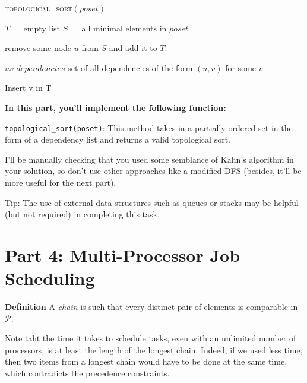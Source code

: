 \documentclass{article}
\begin{document}
    \begin{algorithm}
        \caption{\textsc{topological\_sort}$(poset)$}\label{alg:cap}
        \label{alg:topological_sort}
        \begin{algorithmic}
            \State $T = $ empty list
            \State $S = $ all minimal elements in $poset$
            
                remove some node $u$ from $S$ and add it to $T$.

                \State $uv\_dependencies$ set of all dependencies of the form $(u, v)$ for some $v$.

                        Insert v in T
                    \EndIf

                \EndFor

            \EndWhile
            
                
            \State {}
        \end{algorithmic}
    \end{algorithm}


    \vspace{3mm}
    \begin{tcolorbox}[colback=yellow!30]
        \textbf{In this part, you'll implement the following function:}
        
        \lstinline{topological_sort(poset)}: This method takes in a partially ordered set in the form of a dependency list and returns a valid topological sort. 

        I'll be manually checking that you used some semblance of Kahn's algorithm in your solution, so don't use other approaches like a modified DFS (besides, it'll be more useful for the next part).

        Tip: The use of external data structures such as queues or stacks may be helpful (but not required) in completing this task.
    \end{tcolorbox}

\section*{Part 4: Multi-Processor Job Scheduling}

    \textbf{Definition} A \textit{chain} is such that every distinct pair of elements is comparable in $\mathcal{P}$.

    Note taht the time it takes to schedule tasks, even with an unlimited number of processors, is at least the length of the longest chain. Indeed, if we used less time, then two items from a longest chain would have to be done at the same time, which contradicts the precedence constraints. 
\end{document}
